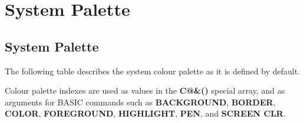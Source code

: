 \chapter{System Palette}

\section{System Palette}
\label{appendix:colourtable}

The following table describes the system colour palette as it is defined by
default.

Colour palette indexes are used as values in the {\bf C@\&()} special array,
and as arguments for BASIC commands such as {\bf BACKGROUND}, {\bf BORDER},
{\bf COLOR}, {\bf FOREGROUND}, {\bf HIGHLIGHT}, {\bf PEN}, and {\bf SCREEN
CLR}.


